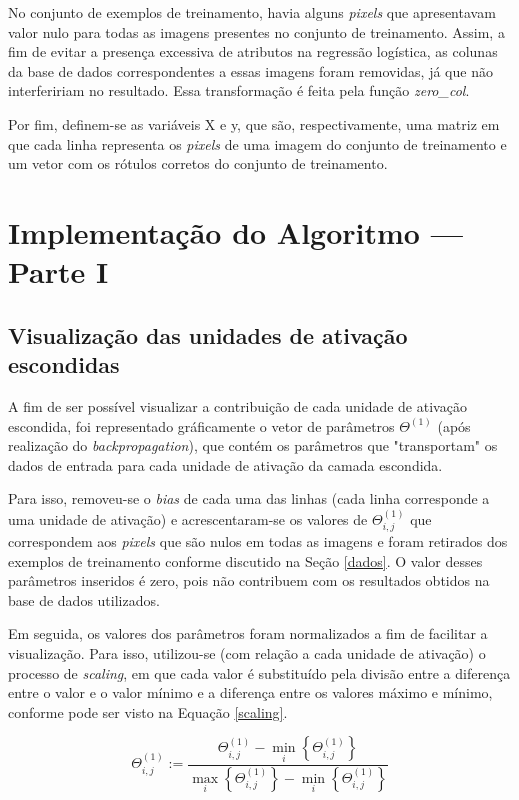 \documentclass[12pt]{article}
\begin{document}
No conjunto de exemplos de treinamento, havia alguns \textit{pixels} que apresentavam valor nulo para todas as imagens presentes no conjunto de treinamento. Assim, a fim de evitar a presença excessiva de atributos na regressão logística, as colunas da base de dados correspondentes a essas imagens foram removidas, já que não interfeririam no resultado. Essa transformação é feita pela função \textit{zero\_col}.

Por fim, definem-se as variáveis X e y, que são, respectivamente, uma matriz em que cada linha representa os \textit{pixels} de uma imagem do conjunto de treinamento e um vetor com os rótulos corretos do conjunto de treinamento.

\section{Implementação do Algoritmo --- Parte I} \label{parte1}

\subsection{Visualização das unidades de ativação escondidas}
A fim de ser possível visualizar a contribuição de cada unidade de ativação escondida, foi representado gráficamente o vetor de parâmetros $\Theta^{(1)}$ (após realização do \textit{backpropagation}), que contém os parâmetros que "transportam" os dados de entrada para cada unidade de ativação da camada escondida.

Para isso, removeu-se o \textit{bias} de cada uma das linhas (cada linha corresponde a uma unidade de ativação) e acrescentaram-se os valores de $\Theta^{(1)}_{i,j}$ que correspondem aos \textit{pixels} que são nulos em todas as imagens e foram retirados dos exemplos de treinamento conforme discutido na Seção \ref{dados}. O valor desses parâmetros inseridos é zero, pois não contribuem com os resultados obtidos na base de dados utilizados.

Em seguida, os valores dos parâmetros foram normalizados a fim de facilitar a visualização. Para isso, utilizou-se (com relação a cada unidade de ativação) o processo de \textit{scaling}, em que cada valor é substituído pela divisão entre a diferença entre o valor e o valor mínimo e a diferença entre os valores máximo e mínimo, conforme pode ser visto na Equação \ref{scaling}.

\begin{equation} \label{scaling}
\Theta^{(1)}_{i,j} := \frac{ \Theta^{(1)}_{i,j} - \min\limits_i\left\{\Theta^{(1)}_{i,j}\right\}}{\max\limits_i\left\{\Theta^{(1)}_{i,j}\right\} - \min\limits_i\left\{\Theta^{(1)}_{i,j}\right\}}
\end{equation}
\end{document}
